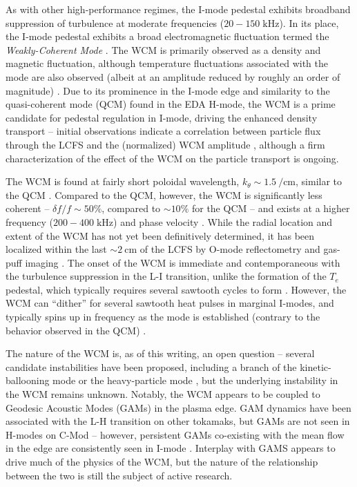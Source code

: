 As with other high-performance regimes, the I-mode pedestal exhibits broadband suppression of turbulence at moderate frequencies ($20-150\;\si{\kilo\hertz}$).  In its place, the I-mode pedestal exhibits a broad electromagnetic fluctuation termed the \emph{Weakly-Coherent Mode} \cite{Whyte2010}.  The WCM is primarily observed as a density and magnetic fluctuation, although temperature fluctuations associated with the mode are also observed (albeit at an amplitude reduced by roughly an order of magnitude) \cite{Cziegler2013,Dominguez2012,White2011}.  Due to its prominence in the I-mode edge and similarity to the quasi-coherent mode (QCM) found in the EDA H-mode, the WCM is a prime candidate for pedestal regulation in I-mode, driving the enhanced density transport -- initial observations indicate a correlation between particle flux through the LCFS and the (normalized) WCM amplitude \cite{Dominguez2012}, although a firm characterization of the effect of the WCM on the particle transport is ongoing.

The WCM is found at fairly short poloidal wavelength, $k_\theta \sim \SI{1.5}{\per\centi\meter}$, similar to the QCM \cite{Dominguez2012}.  Compared to the QCM, however, the WCM is significantly less coherent -- $\delta f/f \sim 50\%$, compared to $\sim 10\%$ for the QCM -- and exists at a higher frequency ($200-400\;\si{\kilo\hertz}$) and phase velocity \cite{Hubbard2011,Cziegler2013}.  While the radial location and extent of the WCM has not yet been definitively determined, it has been localized within the last $\sim \SI{2}{\centi\meter}$ of the LCFS by O-mode reflectometry \cite{Dominguez2012} and gas-puff imaging \cite{Cziegler2011,Cziegler2013}.  The onset of the WCM is immediate and contemporaneous with the turbulence suppression in the L-I transition, unlike the formation of the $T_e$ pedestal, which typically requires several sawtooth cycles to form \cite{Cziegler2011}.  However, the WCM can ``dither'' for several sawtooth heat pulses in marginal I-modes, and typically spins up in frequency as the 
mode is established (contrary to the behavior observed in the QCM) \cite{Cziegler2011,Hubbard2011}.

The nature of the WCM is, as of this writing, an open question -- several candidate instabilities have been proposed, including a branch of the kinetic-ballooning mode \cite{Tang1980} or the heavy-particle mode \cite{Coppi2012,Coppi2012a}, but the underlying instability in the WCM remains unknown.  Notably, the WCM appears to be coupled to Geodesic Acoustic Modes (GAMs) in the plasma edge.  GAM dynamics have been associated with the L-H transition on other tokamaks, but GAMs are not seen in H-modes on C-Mod -- however, persistent GAMs co-existing with the mean flow in the edge are consistently seen in I-mode \cite{Cziegler2013}.  Interplay with GAMS appears to drive much of the physics of the WCM, but the nature of the relationship between the two is still the subject of active research.\nicechapterending


